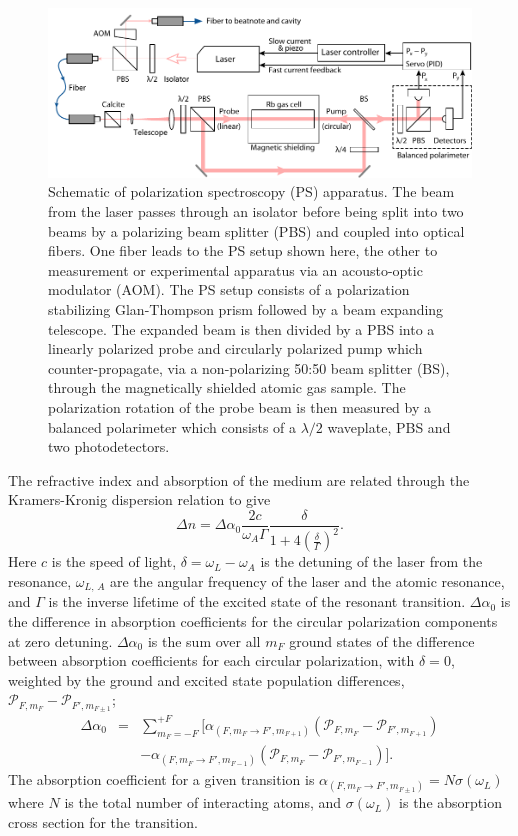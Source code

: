 \documentclass[10pt,letterpaper]{article}
\begin{document}
\begin{figure}[htbp]
\centering
\includegraphics[width=\linewidth]{scholten_fig1.pdf}
\caption{Schematic of polarization spectroscopy (PS) apparatus.
The beam from the laser passes through an isolator before being split into two beams by a polarizing beam splitter (PBS) and coupled into optical fibers.
One fiber leads to the PS setup shown here, the other to measurement or experimental apparatus via an acousto-optic modulator (AOM).
The PS setup  consists of a polarization stabilizing Glan-Thompson prism followed by a beam expanding telescope.
The expanded beam is then divided by a PBS into a linearly polarized probe and circularly polarized pump which counter-propagate, via a non-polarizing 50:50 beam splitter (BS), through the magnetically shielded atomic gas sample.
The polarization rotation of the probe beam is then measured by a balanced polarimeter which consists of a $\lambda/2$ waveplate, PBS and two photodetectors.\label{fig:polspec_schematic}}
\end{figure}

The refractive index and absorption of the medium are related through the Kramers-Kronig dispersion relation to give~\cite{demtroder_laser_2003}
\begin{equation}
\Delta n = \Delta\alpha_0 \frac{2c}{\omega_A \Gamma}\frac{\delta}{1+4\left(\frac{\delta}{\Gamma}\right)^2}.\label{result}
\end{equation}
Here $c$ is the speed of light, $\delta=\omega_L-\omega_A$ is the detuning of the laser from the resonance, $\omega_{L,\,A}$ are the angular frequency of the laser and the atomic resonance, and $\Gamma$ is the inverse lifetime of the excited state of the resonant transition.
$\Delta\alpha_0$ is the difference in absorption coefficients for the circular polarization components at zero detuning.
$\Delta\alpha_0$ is the sum over all $m_F$ ground states of the difference between absorption coefficients for each circular polarization, with $\delta=0$, weighted by the ground and excited state population differences, $\mathcal{P}_{F,m_F}-\mathcal{P}_{F',m_{F\pm1}}$;
\begin{eqnarray}
\Delta\alpha_0 &=& \sum_{m_F=-F}^{+F} \big[\alpha_{(F,m_F\rightarrow F',m_{F+1})}(\mathcal{P}_{F,m_F}-\mathcal{P}_{F',m_{F+1}})\nonumber\\
&&-\alpha_{(F,m_F\rightarrow F',m_{F-1})}(\mathcal{P}_{F,m_F}-\mathcal{P}_{F',m_{F-1}})\big].
\end{eqnarray}
The absorption coefficient for a given transition is $\alpha_{(F, m_F\rightarrow F',m_{F\pm1})}=N \sigma(\omega_L)$ where $N$ is the total number of interacting atoms, and $\sigma(\omega_L)$ is the absorption cross section for the transition.
\end{document}
